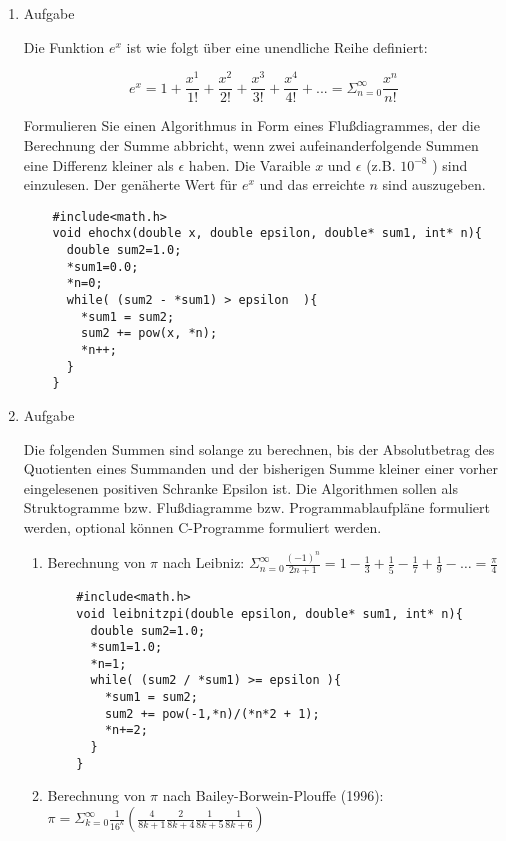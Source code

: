 \documentclass[12pt,a4paper]{scrreprt}
\begin{document}
\begin{enumerate}

\item Aufgabe %

Die Funktion $ e^x $ ist wie folgt über eine unendliche Reihe definiert:

\[
e^x = 1 + \frac{x^1}{1!} + \frac{x^2}{2!} + \frac{x^3}{3!} + \frac{x^4}{4!} + ...
= \Sigma_{n=0}^{\infty} \frac{x^n}{n!}
\]

Formulieren Sie einen Algorithmus in Form eines Flußdiagrammes, der die Berechnung der Summe abbricht, wenn zwei aufeinanderfolgende Summen eine Differenz kleiner als $\epsilon$ haben.
Die Varaible $x$ und $\epsilon$ (z.B. $10^{-8}$ ) sind einzulesen. Der genäherte Wert für $ e^x $ und das erreichte $ n $ sind auszugeben.

\begin{lstlisting}
    #include<math.h>
    void ehochx(double x, double epsilon, double* sum1, int* n){
      double sum2=1.0;
      *sum1=0.0;
      *n=0;
      while( (sum2 - *sum1) > epsilon  ){
        *sum1 = sum2;
        sum2 += pow(x, *n);
        *n++;
      }
    }
\end{lstlisting}

\item Aufgabe %

Die folgenden Summen sind solange zu berechnen, bis der Absolutbetrag des Quotienten eines Summanden und der bisherigen Summe kleiner einer vorher eingelesenen positiven Schranke Epsilon ist. Die Algorithmen sollen als Struktogramme bzw. Flußdiagramme bzw. Programmablaufpläne formuliert werden, optional können C-Programme formuliert werden.

\begin{enumerate}

\item Berechnung von $\pi$ nach Leibniz: $ \Sigma_{n=0}^{\infty} \frac{(-1)^n}{2n+1} = 1-\frac{1}{3}+\frac{1}{5}-\frac{1}{7}+\frac{1}{9}-\ldots=\frac{\pi}{4} $

\begin{lstlisting}
    #include<math.h>
    void leibnitzpi(double epsilon, double* sum1, int* n){
      double sum2=1.0;
      *sum1=1.0;
      *n=1;
      while( (sum2 / *sum1) >= epsilon ){
        *sum1 = sum2;
        sum2 += pow(-1,*n)/(*n*2 + 1);
        *n+=2;
      }
    }
\end{lstlisting}

\item Berechnung von $\pi$ nach Bailey-Borwein-Plouffe (1996): $ \pi = \Sigma_{k=0}^{\infty} \frac{1}{16^k} \left( \frac{4}{8k+1} \frac{2}{8k+4} \frac{1}{8k+5} \frac{1}{8k+6} \right)  $


\end{enumerate}
\end{enumerate}
\end{document}
